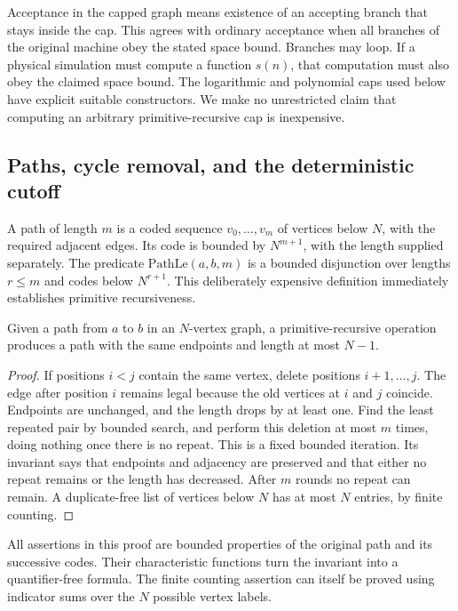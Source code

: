 Acceptance in the capped graph means existence of an accepting branch that
stays inside the cap. This agrees with ordinary acceptance when all branches
of the original machine obey the stated space bound. Branches may loop. If a
physical simulation must compute a function $s(n)$, that computation must
also obey the claimed space bound. The logarithmic and polynomial caps used
below have explicit suitable constructors. We make no unrestricted claim
that computing an arbitrary primitive-recursive cap is inexpensive.

\subsection{Paths, cycle removal, and the deterministic cutoff}

A path of length $m$ is a coded sequence $v_0,\ldots,v_m$ of vertices below
$N$, with the required adjacent edges. Its code is bounded by $N^{m+1}$,
with the length supplied separately. The predicate
$\mathrm{PathLe}(a,b,m)$ is a bounded disjunction over lengths $r\leq m$ and
codes below $N^{r+1}$. This deliberately expensive definition immediately
establishes primitive recursiveness.

\begin{lemma}
Given a path from $a$ to $b$ in an $N$-vertex graph, a primitive-recursive
operation produces a path with the same endpoints and length at most $N-1$.
\end{lemma}
\begin{proof}
If positions $i<j$ contain the same vertex, delete positions
$i+1,\ldots,j$. The edge after position $i$ remains legal because the old
vertices at $i$ and $j$ coincide. Endpoints are unchanged, and the length
drops by at least one. Find the least repeated pair by bounded search, and
perform this deletion at most $m$ times, doing nothing once there is no
repeat. This is a fixed bounded iteration. Its invariant says that endpoints
and adjacency are preserved and that either no repeat remains or the length
has decreased. After $m$ rounds no repeat can remain. A duplicate-free list
of vertices below $N$ has at most $N$ entries, by finite counting.
\end{proof}

All assertions in this proof are bounded properties of the original path and
its successive codes. Their characteristic functions turn the invariant into
a quantifier-free formula. The finite counting assertion can itself be proved
using indicator sums over the $N$ possible vertex labels.

